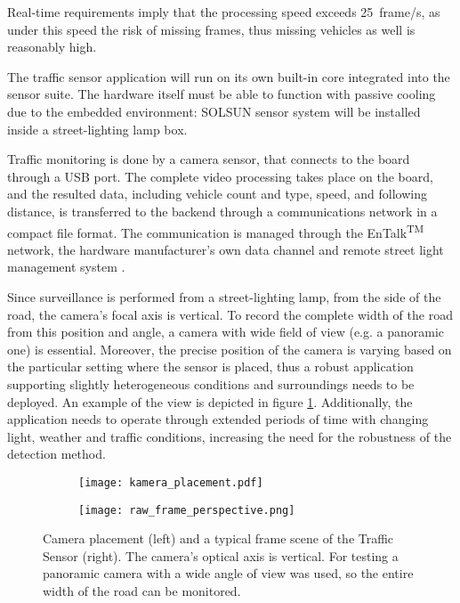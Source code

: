 Real-time requirements imply that the processing speed exceeds \SI{25}{frame/s}, as under this speed the risk of missing frames, thus missing vehicles as well is reasonably high.

The traffic sensor application will run on its own built-in core integrated into the sensor suite.
The hardware itself must be able to function with passive cooling due to the embedded environment: SOLSUN sensor system will be installed inside a street-lighting lamp box.

Traffic monitoring is done by a camera sensor, that connects to the board through a USB port.
The complete video processing takes place on the board, and the resulted data, including vehicle count and type, speed, and following distance, is transferred to the backend through a communications network in a compact file format.
The communication is managed through the EnTalk\textsuperscript{TM} network, the hardware manufacturer's own data channel and remote street light management system \cite{EnTalk}.

Since surveillance is performed from a street-lighting lamp, from the side of the road, the camera's focal axis is vertical.
To record the complete width of the road from this position and angle, a camera with wide field of view (e.g. a panoramic one) is essential.
Moreover, the precise position of the camera is varying based on the particular setting where the sensor is placed, thus a robust application supporting slightly heterogeneous conditions and surroundings needs to be deployed. 
An example of the view is depicted in figure \ref{fig:camera_position}.
Additionally, the application needs to operate through extended periods of time with changing light, weather and traffic conditions, increasing the need for the robustness of the detection method.

\begin{figure}
	\centering
	\begin{subfigure}[b]{.47\textwidth}
		\centering
		\texttt{[image: kamera\_placement.pdf]}
	\end{subfigure}%
	\begin{subfigure}[b]{.47\textwidth}
		\centering
		\texttt{[image: raw\_frame\_perspective.png]}
	\end{subfigure}
	\caption[Camera placement and typical frame scene of the Traffic Sensor]{Camera placement (left) and a typical frame scene of the Traffic Sensor (right). The camera's optical axis is vertical. For testing a panoramic camera with a wide angle of view was used, so the entire width of the road can be monitored.}
	\label{fig:camera_position}
\end{figure}

